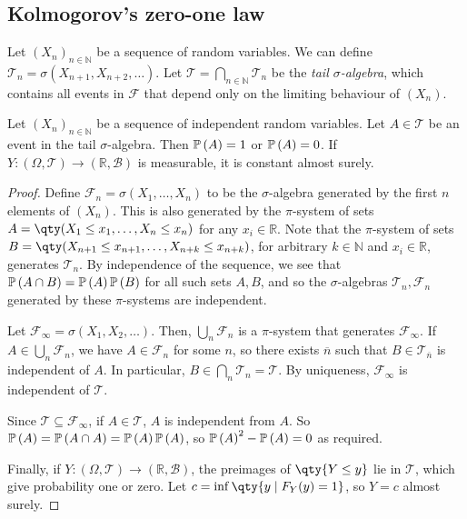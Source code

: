 \subsection{Kolmogorov's zero-one law}
Let $(X_n)_{n \in \mathbb N}$ be a sequence of random variables.
We can define $\mathcal T_n = \sigma(X_{n+1}, X_{n+2}, \dots)$.
Let $\mathcal T = \bigcap_{n \in \mathbb N} \mathcal T_n$ be the \emph{tail $\sigma$-algebra}, which contains all events in $\mathcal F$ that depend only on the limiting behaviour of $(X_n)$.
\begin{theorem}
	Let $(X_n)_{n \in \mathbb N}$ be a sequence of independent random variables.
	Let $A \in \mathcal T$ be an event in the tail $\sigma$-algebra.
	Then $\mathbb{P}\left({A}\right) = 1$ or $\mathbb{P}\left({A}\right) = 0$.
	If $Y \colon (\Omega,\mathcal T) \to (\mathbb R,\mathcal B)$ is measurable, it is constant almost surely.
\end{theorem}
\begin{proof}
	Define $\mathcal F_n = \sigma(X_1, \dots, X_n)$ to be the $\sigma$-algebra generated by the first $n$ elements of $(X_n)$.
	This is also generated by the $\pi$-system of sets $A = \qty(X_1 \leq x_1, \dots, X_n \leq x_n)$ for any $x_i \in \mathbb R$.
	Note that the $\pi$-system of sets $B = \qty(X_{n+1} \leq x_{n+1}, \dots, X_{n+k} \leq x_{n+k})$, for arbitrary $k \in \mathbb N$ and $x_i \in \mathbb R$, generates $\mathcal T_n$.
	By independence of the sequence, we see that $\mathbb{P}\left({A \cap B}\right) = \mathbb{P}\left({A}\right) \mathbb{P}\left({B}\right)$ for all such sets $A, B$, and so the $\sigma$-algebras $\mathcal T_n, \mathcal F_n$ generated by these $\pi$-systems are independent.

	Let $\mathcal F_\infty = \sigma(X_1, X_2, \dots)$.
	Then, $\bigcup_n \mathcal F_n$ is a $\pi$-system that generates $\mathcal F_\infty$.
	If $A \in \bigcup_n \mathcal F_n$, we have $A \in \mathcal F_n$ for some $n$, so there exists $\overline n$ such that $B \in \mathcal T_{\overline n}$ is independent of $A$.
	In particular, $B \in \bigcap_n \mathcal T_n = \mathcal T$.
	By uniqueness, $\mathcal F_\infty$ is independent of $\mathcal T$.

	Since $\mathcal T \subseteq \mathcal F_\infty$, if $A \in \mathcal T$, $A$ is independent from $A$.
	So $\mathbb{P}\left({A}\right) = \mathbb{P}\left({A \cap A}\right) = \mathbb{P}\left({A}\right)\mathbb{P}\left({A}\right)$, so $\mathbb{P}\left({A}\right)^2 - \mathbb{P}\left({A}\right) = 0$ as required.

	Finally, if $Y \colon (\Omega,\mathcal T) \to (\mathbb R,\mathcal B)$, the preimages of $\qty{Y \leq y}$ lie in $\mathcal T$, which give probability one or zero.
	Let $c = \inf\qty{y \mid F_Y(y) = 1}$, so $Y = c$ almost surely.
\end{proof}
